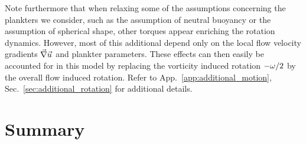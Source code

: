 Note furthermore that when relaxing some of the assumptions concerning the plankters we consider, such as the assumption of neutral buoyancy or the assumption of spherical shape, other torques appear enriching the rotation dynamics.
However, most of this additional depend only on the local flow velocity gradients $\vec{\nabla} \vec{u}$ and plankter parameters.
These effects can then easily be accounted for in this model by replacing the vorticity induced rotation $-\omega/2$ by the overall flow induced rotation.
Refer to App.~\ref{app:additional_motion}, Sec.~\ref{sec:additional_rotation} for additional details.


\section{Summary}

